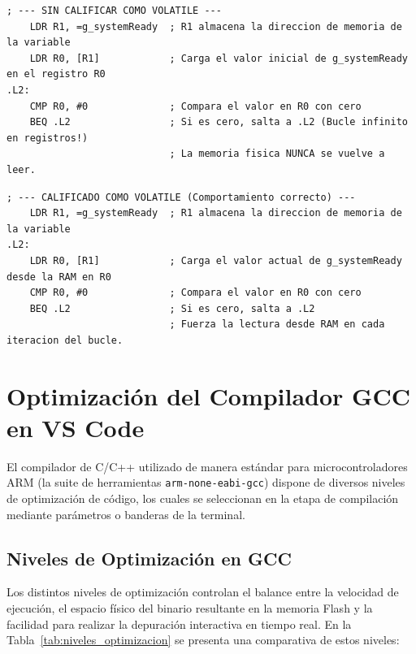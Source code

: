 \documentclass[
10pt, %
a4paper, %
oneside, %
headinclude,footinclude, %
BCOR5mm, %
]{scrartcl}
\begin{document}
\begin{lstlisting}[style=miestiloclaro, caption={Ensamblador generado sin calificar la variable como volatile.}]
; --- SIN CALIFICAR COMO VOLATILE ---
    LDR R1, =g_systemReady  ; R1 almacena la direccion de memoria de la variable
    LDR R0, [R1]            ; Carga el valor inicial de g_systemReady en el registro R0
.L2:
    CMP R0, #0              ; Compara el valor en R0 con cero
    BEQ .L2                 ; Si es cero, salta a .L2 (Bucle infinito en registros!)
                            ; La memoria fisica NUNCA se vuelve a leer.
\end{lstlisting}

\begin{lstlisting}[style=miestiloclaro, caption={Ensamblador generado al calificar la variable como volatile.}]
; --- CALIFICADO COMO VOLATILE (Comportamiento correcto) ---
    LDR R1, =g_systemReady  ; R1 almacena la direccion de memoria de la variable
.L2:
    LDR R0, [R1]            ; Carga el valor actual de g_systemReady desde la RAM en R0
    CMP R0, #0              ; Compara el valor en R0 con cero
    BEQ .L2                 ; Si es cero, salta a .L2
                            ; Fuerza la lectura desde RAM en cada iteracion del bucle.
\end{lstlisting}

\newpage
\section{Optimización del Compilador GCC en VS Code}

El compilador de C/C++ utilizado de manera estándar para microcontroladores ARM (la suite de herramientas \texttt{arm-none-eabi-gcc}) dispone de diversos niveles de optimización de código, los cuales se seleccionan en la etapa de compilación mediante parámetros o banderas de la terminal.

\subsection{Niveles de Optimización en GCC}
Los distintos niveles de optimización controlan el balance entre la velocidad de ejecución, el espacio físico del binario resultante en la memoria Flash y la facilidad para realizar la depuración interactiva en tiempo real. En la Tabla~\ref{tab:niveles_optimizacion} se presenta una comparativa de estos niveles:
\end{document}

